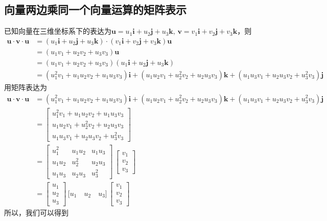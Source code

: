 \subsection{向量两边乘同一个向量运算的矩阵表示}
已知向量在三维坐标系下的表达为$\bm{u} = u_1\bm{i} +u_2\bm{j} +u_3\bm{k}, \, \bm{v} = v_1\bm{i} + v_2\bm{j} + v_3 \bm{k}$，则
\begin{align*}
	\bm{u} \cdot \bm{v} \cdot \bm{u}  &= (u_1\bm{i} +u_2\bm{j} +u_3\bm{k}) \cdot (v_1\bm{i} + v_2\bm{j} + v_3 \bm{k}) \bm{u} \\
	& = (u_1v_1 + u_2v_2 + u_3v_3) \bm{u} \\
	& =  (u_1v_1 + u_2v_2 + u_3v_3) (u_1\bm{i} +u_2\bm{j} +u_3\bm{k}) \\
	& = (u_1^2 v_1 + u_1u_2v_2 + u_1u_3 v_3) \bm{i} + (u_1u_2v_1 + u_2^2 v_2 + u_2u_3v_3)\bm{k} + (u_1u_3v_1 + u_2u_3v_2 + u_3^2v_3) \bm{j}
\end{align*}
用矩阵表达为
\begin{align*}
	\bm{u} \cdot \bm{v} \cdot \bm{u} &= (u_1^2 v_1 + u_1u_2v_2 + u_1u_3 v_3) \bm{i} + (u_1u_2v_1 + u_2^2 v_2 + u_2u_3v_3)\bm{k} + (u_1u_3v_1 + u_2u_3v_2 + u_3^2v_3) \bm{j} \\
	& =
	\begin{bmatrix}
		u_1^2v_1 + u_1u_2 v_2 + u_1u_3 v_3 \\
		u_1u_2v_1 + u_2^2 v_2 + u_2u_3v_3 \\
		u_1u_3v_1 + u_2u_3v_2 + u_3^2v_3
	\end{bmatrix}\\[0.5em]
	& = 
	\begin{bmatrix}
		u_1^2 & u_1u_2 & u_1u_3 \\
		u_1u_2 & u_2^2 & u_2u_3 \\
		u_1u_3 & u_2u_3 & u_3^2
	\end{bmatrix}
	\,
	\begin{bmatrix}
		v_1 \\
		v_2 \\
		v_3
	\end{bmatrix} \\[0.5em]
& = 
\begin{bmatrix}
	u_1 \\
	u_2 \\
	u_3
\end{bmatrix}
\,
\big[ u_1 \quad u_2 \quad u_3 \big]
\,
\begin{bmatrix}
	v_1 \\
	v_2 \\
	v_3
\end{bmatrix}
\end{align*}
所以，我们可以得到


